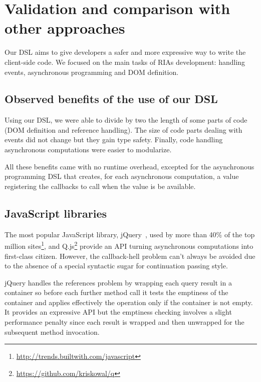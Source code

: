 \documentclass[american,english,runningheads]{llncs}
\begin{document}
\section{Validation and comparison with other approaches}
\label{validation}

Our DSL aims to give developers a safer and more expressive way to write the client-side code. We focused on the main tasks of RIAs development: handling events, asynchronous programming and DOM definition.

\subsection{Observed benefits of the use of our DSL}

Using our DSL, we were able to divide by two the length of some parts of code (DOM definition and  reference handling). The size of code parts dealing with events did not change but they gain type safety. Finally, code handling asynchronous computations were easier to modularize.

All these benefits came with no runtime overhead, excepted for the asynchronous programming DSL that creates, for each asynchronous computation, a  value registering the callbacks to call when the value is be available.

\subsection{JavaScript libraries}

The most popular JavaScript library, jQuery~\cite{Bibeault08_jQuery}, used by more than 40\% of the top million sites\footnote{\href{http://trends.builtwith.com/javascript}{http://trends.builtwith.com/javascript}}, and Q.js\footnote{\href{https://github.com/kriskowal/q}{https://github.com/kriskowal/q}} provide an API turning asynchronous computations into first-class citizen. However, the callback-hell problem can’t always be avoided due to the absence of a special syntactic sugar for continuation passing style.

jQuery handles the  references problem by wrapping each query result in a container so before each further method call it tests the emptiness of the container and applies effectively the operation only if the container is not empty. It provides an expressive API but the emptiness checking involves a slight performance penalty since each result is wrapped and then unwrapped for the subsequent method invocation.
\end{document}
